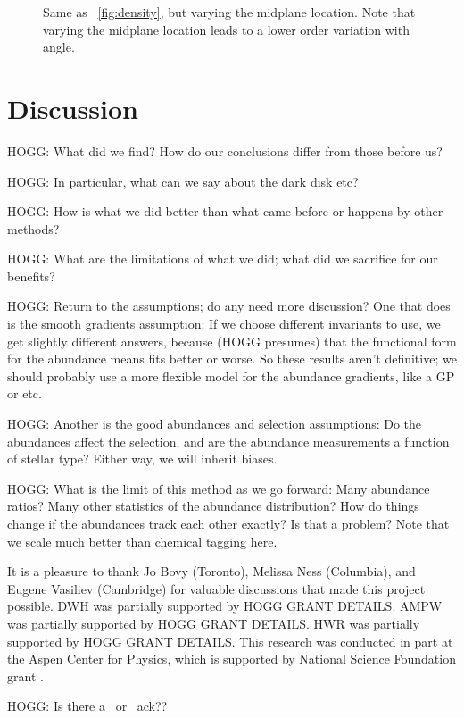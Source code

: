 \documentclass[modern]{aastex63}
\newcommand{\galah}{\acronym{GALAH}}
\newcommand{\hermes}{\acronym{HERMES}}
\begin{document}
\begin{figure}
\caption{Same as \figurename~\ref{fig:density}, but varying the midplane location. Note
that varying the midplane location leads to a lower order variation with angle.\label{fig:midplane}}
\end{figure}

\section{Discussion}

HOGG: What did we find? How do our conclusions differ from those before us?

HOGG: In particular, what can we say about the dark disk etc?

HOGG: How is what we did better than what came before or happens by other methods?

HOGG: What are the limitations of what we did; what did we sacrifice for our benefits?

HOGG: Return to the assumptions; do any need more discussion? One that does is the smooth
gradients assumption: If we choose different invariants to use, we get slightly different
answers, because (HOGG presumes) that the functional form for the abundance means fits
better or worse. So these results aren't definitive; we should probably use a more flexible
model for the abundance gradients, like a GP or etc.

HOGG: Another is the good abundances and selection assumptions: Do the abundances affect
the selection, and are the abundance measurements a function of stellar type? Either way,
we will inherit biases.

HOGG: What is the limit of this method as we go forward: Many abundance ratios? Many other
statistics of the abundance distribution? How do things change if the abundances track
each other exactly? Is that a problem? Note that we scale much better than chemical tagging
here.

\acknowledgements
It is a pleasure to thank
  Jo Bovy (Toronto),
  Melissa Ness (Columbia),
  and
  Eugene Vasiliev (Cambridge)
for valuable discussions that made this project possible.
DWH was partially supported by HOGG GRANT DETAILS.
AMPW was partially supported by HOGG GRANT DETAILS.
HWR was partially supported by HOGG GRANT DETAILS.
This research was conducted in part at the Aspen Center for Physics,
which is supported by National Science Foundation grant .

HOGG: Is there a \galah\ or \hermes\ ack??
\end{document}
